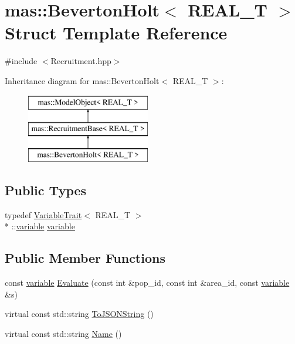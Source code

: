 \hypertarget{structmas_1_1_beverton_holt}{\section{mas\-:\-:Beverton\-Holt$<$ R\-E\-A\-L\-\_\-\-T $>$ Struct Template Reference}
\label{structmas_1_1_beverton_holt}
}


{\ttfamily \#include $<$Recruitment.\-hpp$>$}

Inheritance diagram for mas\-:\-:Beverton\-Holt$<$ R\-E\-A\-L\-\_\-\-T $>$\-:\begin{figure}[H]
\begin{center}
\leavevmode
\includegraphics[height=3.000000cm]{structmas_1_1_beverton_holt}
\end{center}
\end{figure}
\subsection*{Public Types}
\begin{DoxyCompactItemize}
\item 
typedef \hyperlink{structmas_1_1_variable_trait}{Variable\-Trait}$<$ R\-E\-A\-L\-\_\-\-T $>$\\*
\-::\hyperlink{structmas_1_1_beverton_holt_af5114ac8a1dceb03a3148bd6ad7ea57a}{variable} \hyperlink{structmas_1_1_beverton_holt_af5114ac8a1dceb03a3148bd6ad7ea57a}{variable}
\end{DoxyCompactItemize}
\subsection*{Public Member Functions}
\begin{DoxyCompactItemize}
\item 
const \hyperlink{structmas_1_1_beverton_holt_af5114ac8a1dceb03a3148bd6ad7ea57a}{variable} \hyperlink{structmas_1_1_beverton_holt_a2fbd4bf3841b23145fc9000fac124818}{Evaluate} (const int \&pop\-\_\-id, const int \&area\-\_\-id, const \hyperlink{structmas_1_1_beverton_holt_af5114ac8a1dceb03a3148bd6ad7ea57a}{variable} \&s)
\item 
virtual const std\-::string \hyperlink{structmas_1_1_beverton_holt_a273d2704a4974d3fdbb9287ad0984b69}{To\-J\-S\-O\-N\-String} ()
\item 
virtual const std\-::string \hyperlink{structmas_1_1_beverton_holt_aa6e6f7fa8edecf211eedee2d2219c3ce}{Name} ()
\end{DoxyCompactItemize}
